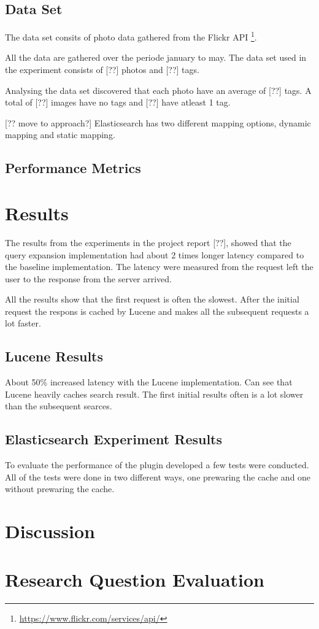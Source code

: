\subsection{Data Set}
\label{sec:dataset}
The data set consits of photo data gathered from the Flickr API \footnote{\url{https://www.flickr.com/services/api/}}.

All the data are gathered over the periode january to may.
The data set used in the experiment consists of [??] photos and [??] tags.

Analysing the data set discovered that each photo have an average of [??] tags.
A total of [??] images have no tags and [??] have atleast 1 tag.

[?? move to approach?]
Elasticsearch has two different mapping options, dynamic mapping and static mapping.


\subsection{Performance Metrics}

\section{Results}
\label{sec:results}
The results from the experiments in the project report [??],
showed that the query expansion implementation had about 2 times longer latency compared to the baseline implementation.
The latency were measured from the request left the user to the response from the server arrived.

All the results show that the first request is often the slowest.
After the initial request the respons is cached by Lucene and makes all the subsequent requests a lot faster.

\subsection{Lucene Results}
About 50\% increased latency with the Lucene implementation.
Can see that Lucene heavily caches search result.
The first initial results often is a lot slower than the subsequent searces.

\subsection{Elasticsearch Experiment Results}
To evaluate the performance of the plugin developed a few tests were conducted.
All of the tests were done in two different ways,
one prewaring the cache and one without prewaring the cache.

\section{Discussion}

\section{Research Question Evaluation}
